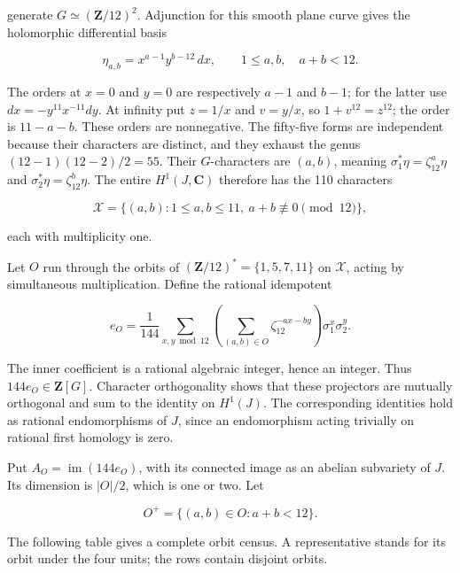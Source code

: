 generate \(G\simeq(\mathbf Z/12)^2\). Adjunction for this smooth plane
curve gives the holomorphic differential basis

\[
 \eta_{a,b}=x^{a-1}y^{b-12}\,dx,\qquad
 1\le a,b,\quad a+b<12.
 \tag{F12.4}
\]

The orders at \(x=0\) and \(y=0\) are respectively \(a-1\) and \(b-1\);
for the latter use \(dx=-y^{11}x^{-11}dy\). At infinity put \(z=1/x\)
and \(v=y/x\), so \(1+v^{12}=z^{12}\); the order is \(11-a-b\). These
orders are nonnegative. The fifty-five forms are independent because
their characters are distinct, and they exhaust the genus
\((12-1)(12-2)/2=55\). Their \(G\)-characters are \((a,b)\), meaning
\(\sigma_1^*\eta=\zeta_{12}^a\eta\) and
\(\sigma_2^*\eta=\zeta_{12}^b\eta\). The entire \(H^1(J,\mathbf C)\)
therefore has the 110 characters

\[
 \mathcal X=\{(a,b):1\le a,b\le11,\ a+b\not\equiv0\pmod{12}\},
\]

each with multiplicity one.

Let \(O\) run through the orbits of \((\mathbf Z/12)^*=\{1,5,7,11\}\) on
\(\mathcal X\), acting by simultaneous multiplication. Define the
rational idempotent

\[
 e_O=\frac1{144}\sum_{x,y\bmod12}
       \left(\sum_{(a,b)\in O}\zeta_{12}^{-ax-by}\right)
       \sigma_1^x\sigma_2^y.
 \tag{F12.5}
\]

The inner coefficient is a rational algebraic integer, hence an integer.
Thus \(144e_O\in\mathbf Z[G]\). Character orthogonality shows that these
projectors are mutually orthogonal and sum to the identity on
\(H^1(J)\). The corresponding identities hold as rational endomorphisms
of \(J\), since an endomorphism acting trivially on rational first
homology is zero.

Put \(A_O=\operatorname{im}(144e_O)\), with its connected image as an
abelian subvariety of \(J\). Its dimension is \(|O|/2\), which is one or
two. Let

\[
 O^+=\{(a,b)\in O:a+b<12\}.
\]

The following table gives a complete orbit census. A representative
stands for its orbit under the four units; the rows contain disjoint
orbits.

